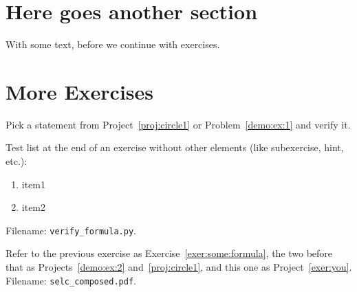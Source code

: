 \documentclass[%
oneside,                 %
final,                   %
10pt]{article}
\newenvironment{doconceexercise}{}{}
\newcounter{doconceexercisecounter}
\theoremstyle{definition}
\begin{document}
\begin{enumerate}
\section{Here goes another section}

With some text, before we continue with exercises.

\section{More Exercises}

\begin{doconceexercise}

                             
\label{exer:some:formula}

Pick a statement from Project~\vref{proj:circle1} or Problem~\vref{demo:ex:1}
and verify it.

Test list at the end of an exercise without other elements (like subexercise,
hint, etc.):

\begin{enumerate}
\item item1

\item item2
\end{enumerate}

\noindent
\noindent Filename: \Verb!verify_formula.py!.

\end{doconceexercise}

\begin{doconceexercise}

                             
\label{exer:you}

Refer to the previous exercise as Exercise~\vref{exer:some:formula},
the two before that as Projects~\vref{demo:ex:2} and~\vref{proj:circle1},
and this one as Project~\vref{exer:you}.
\noindent Filename: \Verb!selc_composed.pdf!.

\end{doconceexercise}


\end{enumerate}
\end{document}
